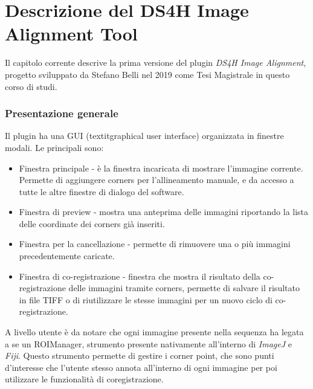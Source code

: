 \chapter{Descrizione del DS4H Image Alignment Tool}
\label{chap:descriptionoldtool}
\noindent Il capitolo corrente descrive la prima versione del plugin \textit{DS4H Image Alignment}, progetto sviluppato da Stefano Belli nel 2019 come Tesi Magistrale in questo corso di studi.

\subsection{Presentazione generale}
\noindent Il plugin ha una GUI (textit{graphical user interface}) organizzata in finestre modali. Le principali sono:
\begin{itemize}
	\item Finestra principale - è la finestra incaricata di mostrare l’immagine corrente. Permette di aggiungere corners per l’allineamento manuale, e da accesso a tutte le altre finestre di dialogo del software.
	\item Finestra di preview - mostra una anteprima delle immagini riportando la lista delle coordinate dei corners già inseriti.
	\item Finestra per la cancellazione - permette di rimuovere una o più immagini precedentemente caricate.
	\item Finestra di co-registrazione - finestra che mostra il risultato della co-registrazione delle immagini tramite corners, permette di salvare il risultato in file TIFF o di riutilizzare le stesse immagini per un nuovo ciclo di co-registrazione.
\end{itemize}

\noindent A livello utente è da notare che ogni immagine presente nella sequenza ha legata a se un ROIManager, strumento presente nativamente all'interno di \textit{ImageJ} e \textit{Fiji}. Questo strumento permette di gestire i corner point, che sono punti d'interesse che l'utente stesso annota all'interno di ogni immagine per poi utilizzare le funzionalità di coregistrazione.


